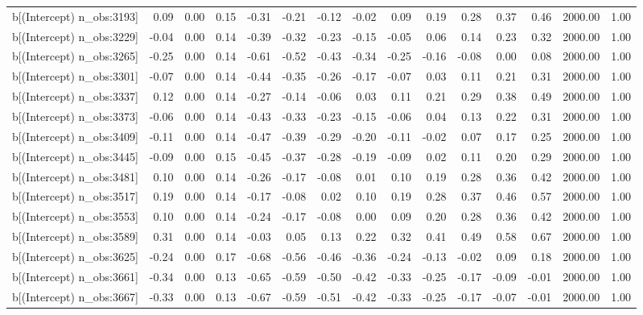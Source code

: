 \begin{table}[ht]
\begin{tabular}{rrrrrrrrrrrrrrr}
  b[(Intercept) n\_obs:3193] & 0.09 & 0.00 & 0.15 & -0.31 & -0.21 & -0.12 & -0.02 & 0.09 & 0.19 & 0.28 & 0.37 & 0.46 & 2000.00 & 1.00 \\ 
  b[(Intercept) n\_obs:3229] & -0.04 & 0.00 & 0.14 & -0.39 & -0.32 & -0.23 & -0.15 & -0.05 & 0.06 & 0.14 & 0.23 & 0.32 & 2000.00 & 1.00 \\ 
  b[(Intercept) n\_obs:3265] & -0.25 & 0.00 & 0.14 & -0.61 & -0.52 & -0.43 & -0.34 & -0.25 & -0.16 & -0.08 & 0.00 & 0.08 & 2000.00 & 1.00 \\ 
  b[(Intercept) n\_obs:3301] & -0.07 & 0.00 & 0.14 & -0.44 & -0.35 & -0.26 & -0.17 & -0.07 & 0.03 & 0.11 & 0.21 & 0.31 & 2000.00 & 1.00 \\ 
  b[(Intercept) n\_obs:3337] & 0.12 & 0.00 & 0.14 & -0.27 & -0.14 & -0.06 & 0.03 & 0.11 & 0.21 & 0.29 & 0.38 & 0.49 & 2000.00 & 1.00 \\ 
  b[(Intercept) n\_obs:3373] & -0.06 & 0.00 & 0.14 & -0.43 & -0.33 & -0.23 & -0.15 & -0.06 & 0.04 & 0.13 & 0.22 & 0.31 & 2000.00 & 1.00 \\ 
  b[(Intercept) n\_obs:3409] & -0.11 & 0.00 & 0.14 & -0.47 & -0.39 & -0.29 & -0.20 & -0.11 & -0.02 & 0.07 & 0.17 & 0.25 & 2000.00 & 1.00 \\ 
  b[(Intercept) n\_obs:3445] & -0.09 & 0.00 & 0.15 & -0.45 & -0.37 & -0.28 & -0.19 & -0.09 & 0.02 & 0.11 & 0.20 & 0.29 & 2000.00 & 1.00 \\ 
  b[(Intercept) n\_obs:3481] & 0.10 & 0.00 & 0.14 & -0.26 & -0.17 & -0.08 & 0.01 & 0.10 & 0.19 & 0.28 & 0.36 & 0.42 & 2000.00 & 1.00 \\ 
  b[(Intercept) n\_obs:3517] & 0.19 & 0.00 & 0.14 & -0.17 & -0.08 & 0.02 & 0.10 & 0.19 & 0.28 & 0.37 & 0.46 & 0.57 & 2000.00 & 1.00 \\ 
  b[(Intercept) n\_obs:3553] & 0.10 & 0.00 & 0.14 & -0.24 & -0.17 & -0.08 & 0.00 & 0.09 & 0.20 & 0.28 & 0.36 & 0.42 & 2000.00 & 1.00 \\ 
  b[(Intercept) n\_obs:3589] & 0.31 & 0.00 & 0.14 & -0.03 & 0.05 & 0.13 & 0.22 & 0.32 & 0.41 & 0.49 & 0.58 & 0.67 & 2000.00 & 1.00 \\ 
  b[(Intercept) n\_obs:3625] & -0.24 & 0.00 & 0.17 & -0.68 & -0.56 & -0.46 & -0.36 & -0.24 & -0.13 & -0.02 & 0.09 & 0.18 & 2000.00 & 1.00 \\ 
  b[(Intercept) n\_obs:3661] & -0.34 & 0.00 & 0.13 & -0.65 & -0.59 & -0.50 & -0.42 & -0.33 & -0.25 & -0.17 & -0.09 & -0.01 & 2000.00 & 1.00 \\ 
  b[(Intercept) n\_obs:3667] & -0.33 & 0.00 & 0.13 & -0.67 & -0.59 & -0.51 & -0.42 & -0.33 & -0.25 & -0.17 & -0.07 & -0.01 & 2000.00 & 1.00 \\ 

\end{tabular}
\end{table}
